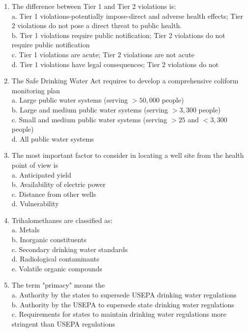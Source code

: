 \begin{enumerate}
\item The difference between Tier 1 and Tier 2 violations is:\\
a. Tier 1 violations-potentially impose-direct and adverse health effects; Tier 2 violations do not pose a direct threat to public health.\\
b. Tier 1 violations require public notification; Tier 2 violations do not require public notification\\ c. Tier 1 violations are acute; Tier 2 violations are not acute\\
d. Tier 1 violations have legal consequences; Tier 2 violations do not\\
\item The Safe Drinking Water Act requires to develop a comprehensive coliform monitoring plan\\
a. Large public water systems (serving $>50,000$ people)\\
b. Large and medium public water systems (serving $>3,300$ people)\\
c. Small and medium public water systems (serving $>25$ and $<3,300$ people)\\
d. All public water systems\\
\item The most important factor to consider in locating a well site from the health point of view is\\
a. Anticipated yield\\
b. Availability of electric power\\
c. Distance from other wells\\
d. Vulnerability\\
\item Trihalomethanes are classified as:\\
a. Metals\\
b. Inorganic constituents\\
c. Secondary drinking water standards\\
d. Radiological contaminants\\
e. Volatile organic compounds\\
\item The term "primacy" means the\\
a. Authority by the states to supersede USEPA drinking water regulations\\
b. Authority by the USEPA to supersede state drinking water regulations\\
c. Requirements for states to maintain drinking water regulations more stringent than USEPA regulations\\

\end{enumerate}
